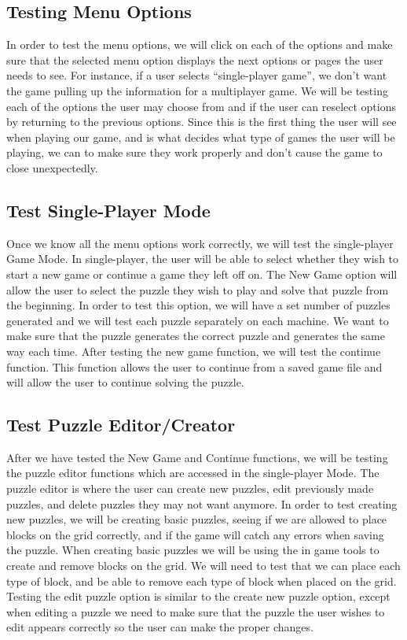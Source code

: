 \documentclass[12pt]{article}
\begin{document}
\subsection{Testing Menu Options}
In order to test the menu options, we will click on each of the options and make sure that the selected menu option displays the next options or pages the user needs to see. For instance, if a user selects “single-player game”, we don't want the game pulling up the information for a multiplayer game.
We will be testing each of the options the user may choose from and if the user can reselect options by returning to the previous options. Since this is the first thing the user will see when playing our game, and is what decides what type of games the user will be playing, we can to make sure they work properly and don't cause the game to close unexpectedly.

\subsection{Test Single-Player Mode}
Once we know all the menu options work correctly, we will test the single-player Game Mode. In single-player, the user will be able to select whether they wish to start a new game or continue a game they left off on. The New Game option will allow the user to select the puzzle they wish to play and solve that puzzle from the beginning. In order to test this option, we will have a set number of puzzles generated and we will test each puzzle separately on each machine. We want to make sure that the puzzle generates the correct puzzle and generates the same way each time. After testing the new game function, we will test the continue function. This function allows the user to continue from a saved game file and will allow the user to continue solving the puzzle.

\subsection{Test Puzzle Editor/Creator}
After we have tested the New Game and Continue functions, we will be testing the puzzle editor functions which are accessed in the single-player Mode. The puzzle editor is where the user can create new puzzles, edit previously made puzzles, and delete puzzles they may not want anymore. In order to test creating new puzzles, we will be creating basic puzzles, seeing if we are allowed to place blocks on the grid correctly, and if the game will catch any errors when saving the puzzle. When creating basic puzzles we will be using the in game tools to create and remove blocks on the grid. We will need to test that we can place each type of block, and be able to remove each type of block when placed on the grid.
Testing the edit puzzle option is similar to the create new puzzle option, except when editing a puzzle we need to make sure that the puzzle the user wishes to edit appears correctly so the user can make the proper changes.
\end{document}
